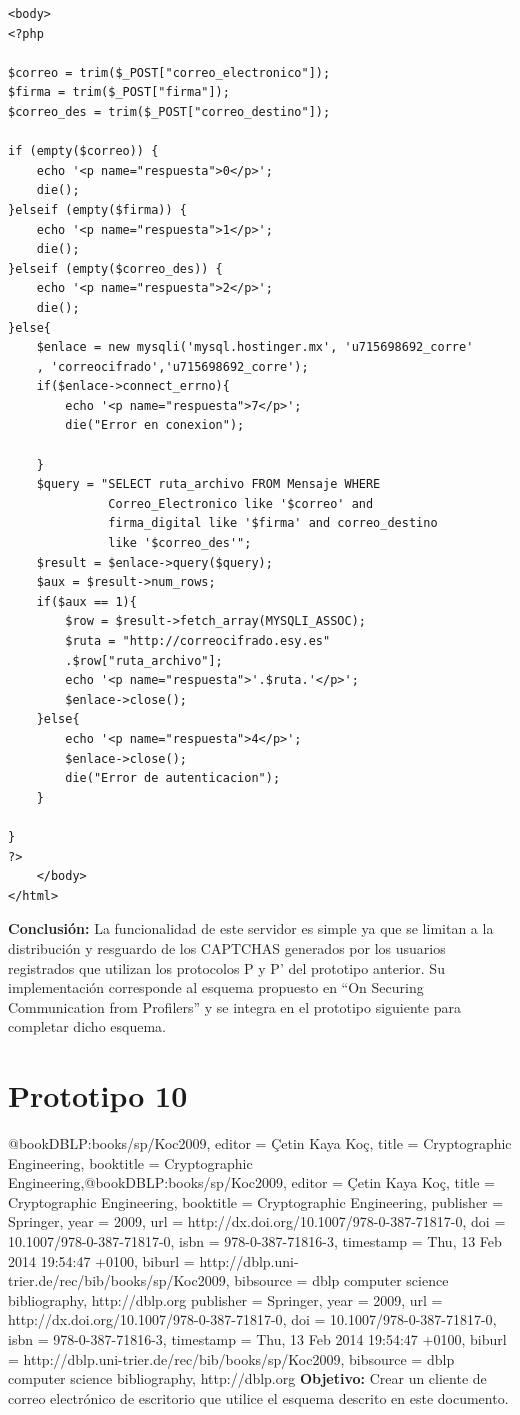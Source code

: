 \documentclass[12pt,oneside,onecolumn,openany]{report}
\begin{document}
\begin{itemize}
\begin{lstlisting}[frame=single]
	<body>
<?php

$correo = trim($_POST["correo_electronico"]);
$firma = trim($_POST["firma"]);
$correo_des = trim($_POST["correo_destino"]);

if (empty($correo)) {
	echo '<p name="respuesta">0</p>';
	die();
}elseif (empty($firma)) {
	echo '<p name="respuesta">1</p>';
	die();
}elseif (empty($correo_des)) {
	echo '<p name="respuesta">2</p>';
	die();
}else{
	$enlace = new mysqli('mysql.hostinger.mx', 'u715698692_corre'
	, 'correocifrado','u715698692_corre');
	if($enlace->connect_errno){
		echo '<p name="respuesta">7</p>';
		die("Error en conexion");

	}
	$query = "SELECT ruta_archivo FROM Mensaje WHERE 
	          Correo_Electronico like '$correo' and 
	          firma_digital like '$firma' and correo_destino 
	          like '$correo_des'";
	$result = $enlace->query($query);
	$aux = $result->num_rows;
	if($aux == 1){
		$row = $result->fetch_array(MYSQLI_ASSOC);
		$ruta = "http://correocifrado.esy.es"
		.$row["ruta_archivo"];
		echo '<p name="respuesta">'.$ruta.'</p>';
		$enlace->close();
	}else{
		echo '<p name="respuesta">4</p>';
		$enlace->close();
		die("Error de autenticacion");
	}

}
?>
	</body>
</html>
 \end{lstlisting}
\end{itemize}
\textbf{Conclusión:} La funcionalidad de este servidor es simple ya que se limitan a la distribución y resguardo de los CAPTCHAS generados por los usuarios registrados que utilizan los protocolos P y P’ del prototipo anterior. Su implementación corresponde al esquema propuesto en “On Securing  Communication  from Profilers” y se integra en el prototipo siguiente para completar dicho esquema.
\section{Prototipo 10}@book{DBLP:books/sp/Koc2009,
  editor    = {{\c{C}}etin Kaya Ko{\c{c}}},
  title     = {Cryptographic Engineering},
  booktitle = {Cryptographic Engineering},@book{DBLP:books/sp/Koc2009,
  editor    = {{\c{C}}etin Kaya Ko{\c{c}}},
  title     = {Cryptographic Engineering},
  booktitle = {Cryptographic Engineering},
  publisher = {Springer},
  year      = {2009},
  url       = {http://dx.doi.org/10.1007/978-0-387-71817-0},
  doi       = {10.1007/978-0-387-71817-0},
  isbn      = {978-0-387-71816-3},
  timestamp = {Thu, 13 Feb 2014 19:54:47 +0100},
  biburl    = {http://dblp.uni-trier.de/rec/bib/books/sp/Koc2009},
  bibsource = {dblp computer science bibliography, http://dblp.org}
}
  publisher = {Springer},
  year      = {2009},
  url       = {http://dx.doi.org/10.1007/978-0-387-71817-0},
  doi       = {10.1007/978-0-387-71817-0},
  isbn      = {978-0-387-71816-3},
  timestamp = {Thu, 13 Feb 2014 19:54:47 +0100},
  biburl    = {http://dblp.uni-trier.de/rec/bib/books/sp/Koc2009},
  bibsource = {dblp computer science bibliography, http://dblp.org}
}
\textbf{Objetivo:} Crear un cliente de correo electrónico de escritorio que utilice el esquema descrito en este documento.
\end{document}
